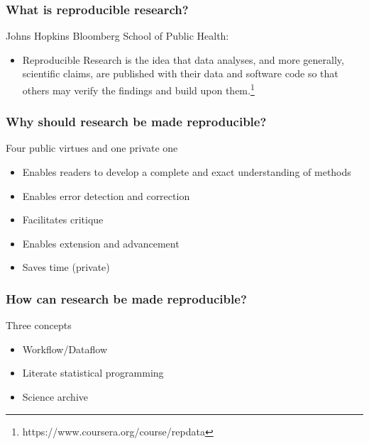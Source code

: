 \documentclass[10pt]{beamer}
\theoremstyle{exercise}
\begin{document}
\begin{frame}[fragile]
  \frametitle{What is reproducible research?}

{\Large Johns Hopkins Bloomberg School of Public Health:}

\vspace{5mm}
  
\begin{itemize}
  \item Reproducible Research is the idea that data analyses, and more generally, scientific claims, are published with their data and software code so that others may verify the findings and build upon them.\footnote{https://www.coursera.org/course/repdata}
\end{itemize}
  
\end{frame}

\begin{frame}[fragile]
  \frametitle{Why should research be made reproducible?}
  
{\Large Four public virtues and one private one}

\vspace{5mm}
  
\begin{itemize}
  \item Enables readers to develop a complete and exact understanding of methods
  \item Enables error detection and correction 
  \item Facilitates critique
  \item Enables extension and advancement
  \item Saves time (private)
\end{itemize}
  
\end{frame}

\begin{frame}[fragile]
  \frametitle{How can research be made reproducible?}
  
{\Large Three concepts}

\vspace{5mm}
  
\begin{itemize}
  \item Workflow/Dataflow
  \item Literate statistical programming
  \item Science archive
\end{itemize}
  
\end{frame}
\end{document}
